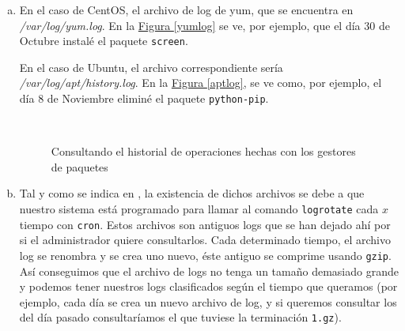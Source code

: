 \documentclass[10pt,a4paper,spanish]{article}
\numberwithin{equation}{section} %
\numberwithin{figure}{section} %
\numberwithin{table}{section} %
\begin{document}
\begin{enumerate}[a)]
    \item En el caso de CentOS, el archivo de log de yum, que se encuentra en \textit{/var/log/yum.log}. En la \hyperref[yumlog]{Figura \ref*{yumlog}} se ve, por ejemplo, que el día 30 de Octubre instalé el paquete \texttt{screen}.

    En el caso de Ubuntu, el archivo correspondiente sería \textit{/var/log/apt/history.log}. En la \hyperref[aptlog]{Figura \ref*{aptlog}}, se ve como, por ejemplo, el día 8 de Noviembre eliminé el paquete \texttt{python-pip}.

    \begin{figure}[!h]
    \centering
    \mbox {
    \qquad
    }
    \caption{Consultando el historial de operaciones hechas con los gestores de paquetes}
    \label{gestordepaquetes}
    \end{figure}

    \item Tal y como se indica en \cite{logrotation}, la existencia de dichos archivos se debe a que nuestro sistema está programado para llamar al comando \texttt{logrotate} cada $x$ tiempo con \texttt{cron}. Estos archivos son antiguos logs que se han dejado ahí por si el administrador quiere consultarlos. Cada determinado tiempo, el archivo log se renombra y se crea uno nuevo, éste antiguo se comprime usando \texttt{gzip}. Así conseguimos que el archivo de logs no tenga un tamaño demasiado grande y podemos tener nuestros logs clasificados según el tiempo que queramos (por ejemplo, cada día se crea un nuevo archivo de log, y si queremos consultar los del día pasado consultaríamos el que tuviese la terminación \texttt{1.gz}).
\end{enumerate}
\end{document}
